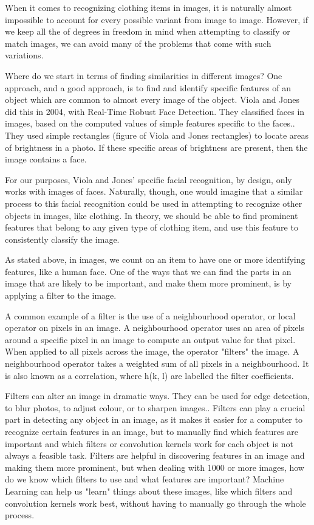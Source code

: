 \documentclass[12pt]{article} %
\begin{document}
	When it comes to recognizing clothing items in images, it is naturally almost impossible to account for every possible variant from image to image. However, if we keep all the of degrees in freedom in mind when attempting to classify or match images, we can avoid many of the problems that come with such variations. 

	Where do we start in terms of finding similarities in different images? One approach, and a good approach, is to find and identify specific features of an object which are common to almost every image of the object. Viola and Jones did this in 2004, with Real-Time Robust Face Detection. They classified faces in images, based on the computed values of simple features specific to the faces.\cite{viola2004robust}. They used simple rectangles (figure of Viola and Jones rectangles) to locate areas of brightness in a photo. If these specific areas of brightness are present, then the image contains a face. 

	For our purposes, Viola and Jones' specific facial recognition, by design, only works with images of faces. Naturally, though, one would imagine that a similar process to this facial recognition could be used in attempting to recognize other objects in images, like clothing. In theory, we should be able to find prominent features that belong to any given type of clothing item, and use this feature to consistently classify the image.
		
	 As stated above, in images, we count on an item to have one or more identifying features, like a human face. One of the ways that we can find the parts in an image that are likely to be important, and make them more prominent, is by applying a filter to the image. 

	A common example of a filter is the use of a neighbourhood operator, or local operator on pixels in an image. A neighbourhood operator uses an area of pixels around a specific pixel in an image to compute an output value for that pixel. When applied to all pixels across the image, the operator "filters" the image. A neighbourhood operator takes a weighted sum of all pixels in a neighbourhood. It is also known as a correlation, where h(k, l) are labelled the filter coefficients. 
	
	Filters can alter an image in dramatic ways. They can be used for edge detection, to blur photos, to adjust colour, or to sharpen images.\cite{szeliski2010computer}. Filters can play a crucial part in detecting any object in an image, as it makes it easier for a computer to recognize certain features in an image, but to manually find which features are important and which filters or convolution kernels work for each object is not always a feasible task. Filters are helpful in discovering features in an image and making them more prominent, but when dealing with 1000 or more images, how do we know which filters to use and what features are important? Machine Learning can help us "learn" things about these images, like which filters and convolution kernels work best, without having to manually go through the whole process. 
\end{document}
